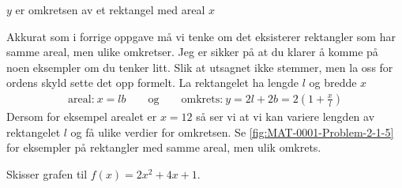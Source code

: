 \documentclass[a4paper,11pt]{article}
\begin{document}
\begin{subproblem}
    $y$ er omkretsen av et rektangel med areal $x$ \UiTcorrect
\end{subproblem}

\begin{solution}
    Akkurat som i forrige oppgave må vi tenke om det eksisterer rektangler som
    har samme areal, men ulike omkretser. Jeg er sikker på at du klarer å komme
    på noen eksempler om du tenker litt. Slik at utsagnet ikke stemmer, men la 
    oss for ordens skyld sette det opp formelt. La rektangelet ha lengde $l$ og
    bredde $x$
    \begin{align*} 
        \text{areal:} \   x = lb \qquad \text{og} \qquad
        \text{omkrets:} \ y = 2l + 2b = 2(1 + \frac{x}{l}) 
    \end{align*}
    Dersom for eksempel arealet er $x = 12$ så ser vi at vi kan variere
    lengden av rektangelet $l$ og få ulike verdier for omkretsen.
    Se \cref{fig:MAT-0001-Problem-2-1-5} 
    for eksempler på rektangler med samme areal, men ulik omkrets.
    
    \begin{center}
        \label{fig:MAT-0001-Problem-2-1-5}
    \end{center}
\end{solution}


\begin{problem}[7]
    Skisser grafen til $f(x) = 2x^2 + 4x + 1$.
\end{problem}
\end{document}
